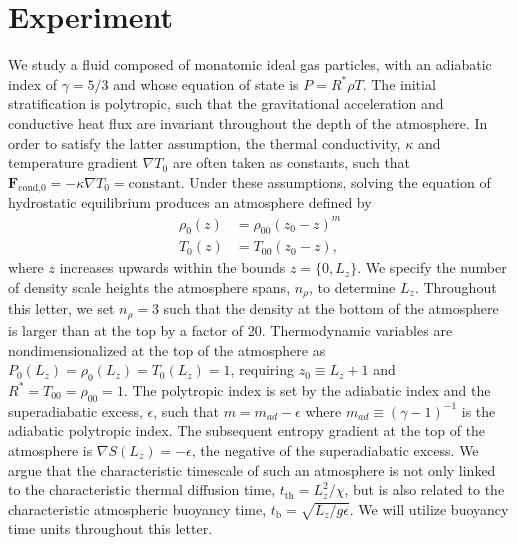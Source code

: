 \documentclass[aps, prl, twocolumn, groupedaddress, amsfonts, amssymb, amsmath]{revtex4-1}
\newcommand{\grad}{\ensuremath{\nabla}}
\begin{document}
\section{Experiment} 
\label{sec:experiment}
We study a fluid composed of monatomic ideal gas particles, with an adiabatic index of $\gamma = 5/3$ and
whose equation of state is $P = R^*\rho T$. 
The initial stratification is polytropic, such that the gravitational
acceleration and conductive heat flux are invariant throughout the depth of the atmosphere. In order
to satisfy the latter assumption, the thermal conductivity, $\kappa$ and temperature gradient
$\grad T_0$ are often taken as constants, such that $\bm{F}_{\text{cond,0}} = -\kappa \grad T_0 = \text{constant}$.
Under these assumptions, solving the equation of hydrostatic equilibrium produces an atmosphere defined by
\begin{equation}
\begin{split}
\rho_0(z) &= \rho_{00}(z_0 - z)^m \\
T_0(z)    &= T_{00}(z_0 - z),
\label{eqn:polytrope}
\end{split}
\end{equation}
where $z$ increases upwards within the bounds $z =\{0, L_{z}\}$.
We specify the number of density scale heights the atmosphere spans, $n_\rho$, to determine $L_{z}$. Throughout
this letter, we set $n_{\rho} = 3$ such that the density at the bottom of the atmosphere is larger
than at the top by a factor of 20.
Thermodynamic variables are nondimensionalized at the top of the atmosphere as 
$P_0(L_z) = \rho_0(L_z) = T_0(L_z) = 1$, requiring $z_0 \equiv L_z + 1$ and $R^* = T_{00} = \rho_{00} = 1$.  
The polytropic index is set by the adiabatic index and the
superadiabatic excess, $\epsilon$, such that $m = m_{ad} - \epsilon$
where $m_{ad} \equiv (\gamma-1)^{-1}$ is the adiabatic polytropic index.
The subsequent entropy gradient at the top of the atmosphere is $\grad S(L_z) = -\epsilon$,
the negative of the superadiabatic excess.  We argue that the characteristic timescale of such an
atmosphere is not only linked to the characteristic thermal diffusion time, $t_{\text{th}} = L_z^2/\chi$,
but is also related to the characteristic atmospheric buoyancy time, $t_{\text{b}} = \sqrt{L_z/g\epsilon}$.
We will utilize buoyancy time units throughout this letter.
\end{document}
